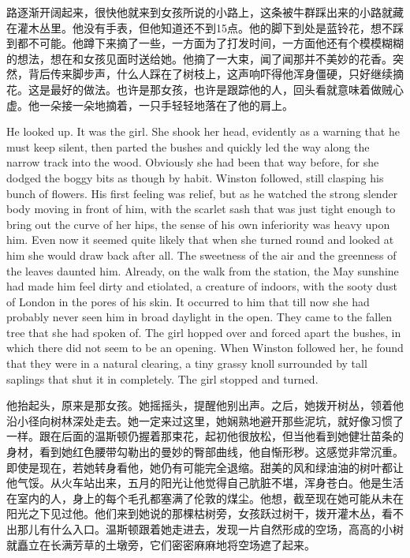 \begin{paracol}{2}
\switchcolumn

路逐渐开阔起来，很快他就来到女孩所说的小路上，这条被牛群踩出来的小路就藏在灌木丛里。他没有手表，但他知道还不到15点。他的脚下到处是蓝铃花，想不踩到都不可能。他蹲下来摘了一些，一方面为了打发时间，一方面他还有个模模糊糊的想法，想在和女孩见面时送给她。他摘了一大束，闻了闻那并不美妙的花香。突然，背后传来脚步声，什么人踩在了树枝上，这声响吓得他浑身僵硬，只好继续摘花。这是最好的做法。也许是那女孩，也许是跟踪他的人，回头看就意味着做贼心虚。他一朵接一朵地摘着，一只手轻轻地落在了他的肩上。

\switchcolumn*

He looked up. It was the girl. She shook her head, evidently as a
warning that he must keep silent, then parted the bushes and quickly led
the way along the narrow track into the wood. Obviously she had been
that way before, for she dodged the boggy bits as though by habit.
Winston followed, still clasping his bunch of flowers. His first feeling
was relief, but as he watched the strong slender body moving in front of
him, with the scarlet sash that was just tight enough to bring out the
curve of her hips, the sense of his own inferiority was heavy upon him.
Even now it seemed quite likely that when she turned round and looked at
him she would draw back after all. The sweetness of the air and the
greenness of the leaves daunted him. Already, on the walk from the
station, the May sunshine had made him feel dirty and etiolated, a
creature of indoors, with the sooty dust of London in the pores of his
skin. It occurred to him that till now she had probably never seen him
in broad daylight in the open. They came to the fallen tree that she had
spoken of. The girl hopped over and forced apart the bushes, in which
there did not seem to be an opening. When Winston followed her, he found
that they were in a natural clearing, a tiny grassy knoll surrounded by
tall saplings that shut it in completely. The girl stopped and turned.

\switchcolumn

他抬起头，原来是那女孩。她摇摇头，提醒他别出声。之后，她拨开树丛，领着他沿小径向树林深处走去。她一定来过这里，她娴熟地避开那些泥坑，就好像习惯了一样。跟在后面的温斯顿仍握着那束花，起初他很放松，但当他看到她健壮苗条的身材，看到她红色腰带勾勒出的曼妙的臀部曲线，他自惭形秽。这感觉非常沉重。即使是现在，若她转身看他，她仍有可能完全退缩。甜美的风和绿油油的树叶都让他气馁。从火车站出来，五月的阳光让他觉得自己肮脏不堪，浑身苍白。他是生活在室内的人，身上的每个毛孔都塞满了伦敦的煤尘。他想，截至现在她可能从未在阳光之下见过他。他们来到她说的那棵枯树旁，女孩跃过树干，拨开灌木丛，看不出那儿有什么入口。温斯顿跟着她走进去，发现一片自然形成的空场，高高的小树就矗立在长满芳草的土墩旁，它们密密麻麻地将空场遮了起来。


\end{paracol}
